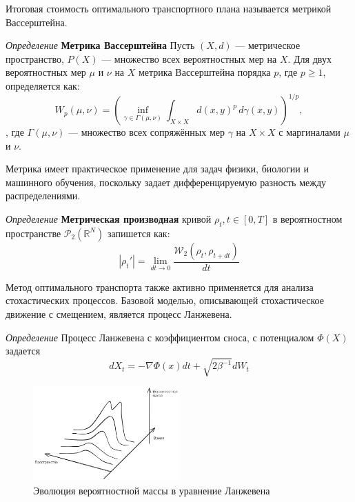 Итоговая стоимость оптимального транспортного плана называется метрикой Вассерштейна.

\textit{Определение} \textbf{Метрика Вассерштейна} Пусть \((X, d)\) — метрическое пространство, 
\(P(X)\) — множество всех вероятностных мер на \(X\). Для двух вероятностных мер \(\mu\) и \(\nu\) на \(X\) 
метрика Вассерштейна порядка \(p\), где \(p \geq 1\), определяется как:
\begin{equation}
    W_p(\mu, \nu) = \left( \inf_{\gamma \in \Gamma(\mu, \nu)} \int_{X \times X} d(x, y)^p \, d\gamma(x, y) \right)^{1/p},
\end{equation}
, где \(\Gamma(\mu, \nu)\) — множество всех сопряжённых мер \(\gamma\) на \(X \times X\) с маргиналами \(\mu\) и \(\nu\).

Метрика имеет практическое применение для задач физики, биологии и машинного обучения, поскольку задает 
дифференцируемую разность между распределениями.

\textit{Определение} \textbf{Метрическая производная} кривой $\rho_t,t \in [0,T]$ в вероятностном 
пространстве $\mathcal{P}_2(\mathbb{R}^N)$ запишется как:
\begin{equation}
    |\rho_t'| = \lim_{dt \rightarrow 0} \frac{\mathcal{W}_2(\rho_t, \rho_{t+dt})}{dt}
\end{equation}

Метод оптимального транспорта также активно применяется для анализа стохастических процессов. Базовой моделью, 
описывающей стохастическое движение с смещением, является процесс Ланжевена.

\textit{Определение} Процесс Ланжевена с коэффициентом сноса, с потенциалом $\Phi(X)$ задается
\begin{equation}
    d X_t = - \nabla \Phi(x) dt + \sqrt{2 \beta^{-1}} d W_t 
\end{equation}

\begin{figure}[h]
    \centering
    \includegraphics[width=0.5\textwidth]{assets/math/transport/fokker-plank.excalidraw.png}
    \caption{Эволюция вероятностной массы в уравнение Ланжевена}
    \label{opt_transport}
\end{figure}

